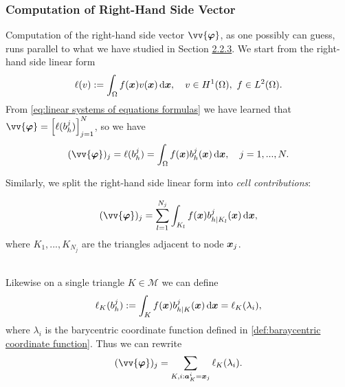 	\subsubsection{Computation of Right-Hand Side Vector}
	Computation of the right-hand side vector $\vv{\bm{\varphi}}$, as one 
	possibly can guess, runs parallel to what we have studied in 
	Section \hyperref[subsubsection.2.2.3]{2.2.3}. We start from 
	the right-hand side linear form 
	\[\ell(v):=\int_{\Omega}f(\bx)v(\bx)\,\dx, \quad v\in H^1(\Omega),\ 
												f\in L^2(\Omega).\]
	From \eqref{eq:linear systems of equations formulas} we have learned that
	$\vv{\bm{\varphi}}=\left[\ell(b_h^j)\right]_{j=1}^{N}$, so we have
	\begin{equation}
		(\vv{\bm{\varphi}})_j=\ell(b_h^j)=\int_{\Omega}f(\bx)b_h^j(\bx)\,\dx,
			\quad j=1,...,N.
	\end{equation}
	
	Similarly, we split the right-hand side linear form into 
	\emph{cell contributions}:
	
	\vspace{10pt}
	\hspace{.07\textwidth}%
	\begin{minipage}{.3\textwidth}
		\centering
		\begin{equation*}
			(\vv{\bm{\varphi}})_j=\sum_{l=1}^{N_j}
				\int_{K_l}f(\bx)b_{h|K_l}^j(\bx)\,\dx,
		\end{equation*}
		where $K_1,...,K_{N_j}$ are the triangles adjacent to node $\bm{x}_j$.
	\end{minipage}%
	\begin{minipage}{.5\textwidth}
		\centering
		
	\end{minipage}\\[8pt]
	
	Likewise on a single triangle $K\in\mathcal{M}$ we can define
	\begin{equation}
		\ell_K(b_h^j):=\int_K f(\bm{x})b_{h|K}^j(\bm{x})\,\mathrm{d}\bm{x}=\ell_K(\lambda_i),
	\end{equation}
	where $\lambda_i$ is the barycentric coordinate function defined in
	\eqref{def:baraycentric coordinate function}. Thus we can rewrite 
	\begin{equation}
		(\vv{\bm{\varphi}})_j=\sum_{K,i:\ba_K^i = \bx_j}\ell_K(\lambda_i).
	\end{equation}

